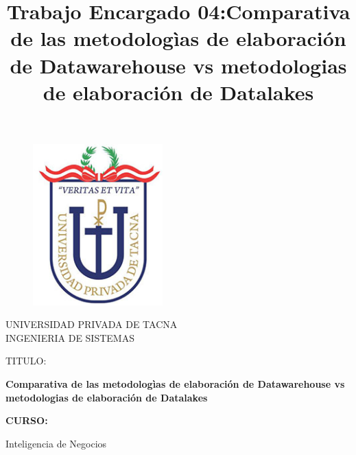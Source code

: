 \documentclass[twoside,twocolumn]{article}
\begin{document}
\title{Trabajo Encargado 04:Comparativa de las metodologìas de elaboración de Datawarehouse vs metodologias de elaboración de Datalakes}

\begin{titlepage}
\begin{figure}[htb]
\begin{center}
\includegraphics[width=5cm]{imagenes/logo.png}
\end{center}    
\end{figure}
\vspace*{-0.25in}
\begin{center}
\large{UNIVERSIDAD PRIVADA DE TACNA}\\
\vspace*{-0.025in}
INGENIERIA DE SISTEMAS  \\	

\vspace*{0.5in}
\begin{large}
TITULO:\\
\end{large}

\vspace*{0.1in}
\begin{Large}
\textbf{ Comparativa de las metodologìas de elaboración de Datawarehouse vs metodologias de elaboración de Datalakes} \\
\end{Large}

\vspace*{0.3in}
\begin{Large}
\textbf{CURSO:} \\
\end{Large}

\vspace*{0.1in}
\begin{large}
Inteligencia de Negocios\\
\end{large}


\end{center}
\end{titlepage}
\end{document}
